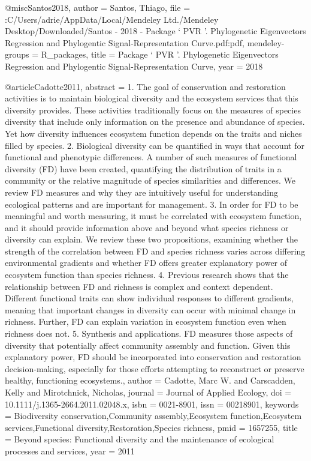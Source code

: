 {{{{{{{@misc{Santos2018,
author = {Santos, Thiago},
file = {:C\:/Users/adrie/AppData/Local/Mendeley Ltd./Mendeley Desktop/Downloaded/Santos - 2018 - Package ‘ PVR '. Phylogenetic Eigenvectors Regression and Phylogentic Signal-Representation Curve.pdf:pdf},
mendeley-groups = {R_packages},
title = {{Package ‘ PVR '. Phylogenetic Eigenvectors Regression and Phylogentic Signal-Representation Curve}},
year = {2018}
}

@article{Cadotte2011,
abstract = {1. The goal of conservation and restoration activities is to maintain biological diversity and the ecosystem services that this diversity provides. These activities traditionally focus on the measures of species diversity that include only information on the presence and abundance of species. Yet how diversity influences ecosystem function depends on the traits and niches filled by species. 2. Biological diversity can be quantified in ways that account for functional and phenotypic differences. A number of such measures of functional diversity (FD) have been created, quantifying the distribution of traits in a community or the relative magnitude of species similarities and differences. We review FD measures and why they are intuitively useful for understanding ecological patterns and are important for management. 3. In order for FD to be meaningful and worth measuring, it must be correlated with ecosystem function, and it should provide information above and beyond what species richness or diversity can explain. We review these two propositions, examining whether the strength of the correlation between FD and species richness varies across differing environmental gradients and whether FD offers greater explanatory power of ecosystem function than species richness. 4. Previous research shows that the relationship between FD and richness is complex and context dependent. Different functional traits can show individual responses to different gradients, meaning that important changes in diversity can occur with minimal change in richness. Further, FD can explain variation in ecosystem function even when richness does not. 5. Synthesis and applications. FD measures those aspects of diversity that potentially affect community assembly and function. Given this explanatory power, FD should be incorporated into conservation and restoration decision-making, especially for those efforts attempting to reconstruct or preserve healthy, functioning ecosystems.},
author = {Cadotte, Marc W. and Carscadden, Kelly and Mirotchnick, Nicholas},
journal = {Journal of Applied Ecology},
doi = {10.1111/j.1365-2664.2011.02048.x},
isbn = {0021-8901},
issn = {00218901},
keywords = {Biodiversity conservation,Community assembly,Ecosystem function,Ecosystem services,Functional diversity,Restoration,Species richness},
pmid = {1657255},
title = {{Beyond species: Functional diversity and the maintenance of ecological processes and services}},
year = {2011}
}

}}}}}}}
